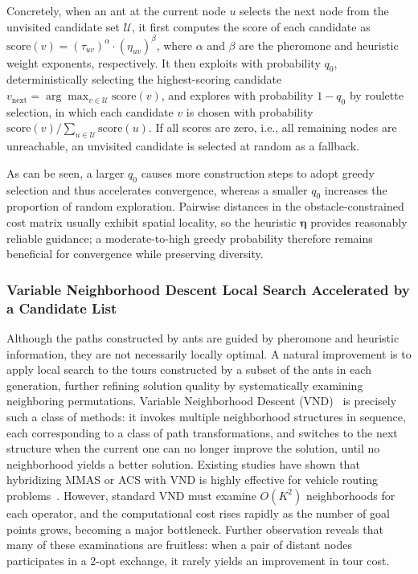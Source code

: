Concretely, when an ant at the current node $u$ selects the next node from the unvisited candidate set $\mathcal{U}$, it first computes the score of each candidate as $\mathrm{score}(v) = (\tau_{uv})^{\alpha} \cdot (\eta_{uv})^{\beta}$, where $\alpha$ and $\beta$ are the pheromone and heuristic weight exponents, respectively. It then exploits with probability $q_0$, deterministically selecting the highest-scoring candidate $v_{\mathrm{next}} = \arg\max_{v \in \mathcal{U}} \mathrm{score}(v)$, and explores with probability $1 - q_0$ by roulette selection, in which each candidate $v$ is chosen with probability $\mathrm{score}(v) / \sum_{u \in \mathcal{U}} \mathrm{score}(u)$. If all scores are zero, i.e., all remaining nodes are unreachable, an unvisited candidate is selected at random as a fallback.

As can be seen, a larger $q_0$ causes more construction steps to adopt greedy selection and thus accelerates convergence, whereas a smaller $q_0$ increases the proportion of random exploration. Pairwise distances in the obstacle-constrained cost matrix usually exhibit spatial locality, so the heuristic $\bm{\eta}$ provides reasonably reliable guidance; a moderate-to-high greedy probability therefore remains beneficial for convergence while preserving diversity.

\subsubsection{Variable Neighborhood Descent Local Search Accelerated by a Candidate List}
\label{subsec:vnd}

Although the paths constructed by ants are guided by pheromone and heuristic information, they are not necessarily locally optimal. A natural improvement is to apply local search to the tours constructed by a subset of the ants in each generation, further refining solution quality by systematically examining neighboring permutations. Variable Neighborhood Descent (VND)~\textcolor{blue}{\cite{ref24}} is precisely such a class of methods: it invokes multiple neighborhood structures in sequence, each corresponding to a class of path transformations, and switches to the next structure when the current one can no longer improve the solution, until no neighborhood yields a better solution. Existing studies have shown that hybridizing MMAS or ACS with VND is highly effective for vehicle routing problems~\textcolor{blue}{\cite{ref25}}. However, standard VND must examine $O(K^2)$ neighborhoods for each operator, and the computational cost rises rapidly as the number of goal points grows, becoming a major bottleneck. Further observation reveals that many of these examinations are fruitless: when a pair of distant nodes participates in a 2-opt exchange, it rarely yields an improvement in tour cost.

